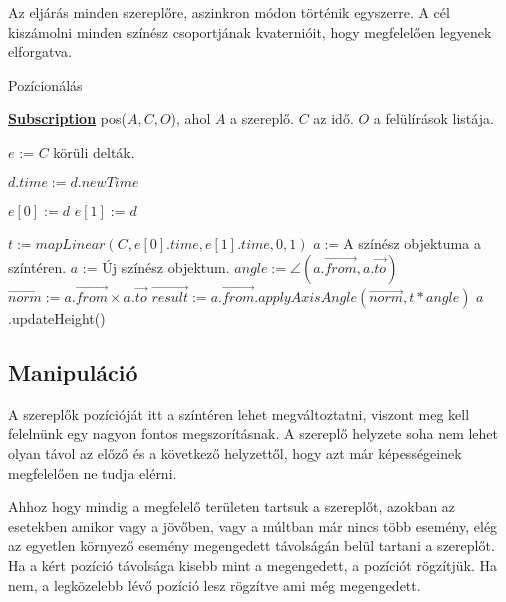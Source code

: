 Az eljárás minden szereplőre, aszinkron módon történik egyszerre. A cél kiszámolni minden színész csoportjának kvaternióit\cite{Quaternion}, hogy megfelelően legyenek elforgatva.

\begin{algorithm}[H]
	\caption{Pozícionálás}
	\label{alg:ibb}
	\textbf{\underline{Subscription}} pos($A, C, O$), ahol $A$ a szereplő. $C$ az idő. $O$ a felülírások listája.
	\begin{algorithmic}[1] %
	\STATE $e$ := $C$ körüli delták.

					\STATE $d.time := d.newTime$
				\ENDIF
			\ENDFOR

				\STATE $e[0] := d$
			\ENDIF
				\STATE $e[1] := d$
			\ENDIF

		\ENDFOR
	\ENDIF

	\STATE $t := mapLinear(C, e[0].time, e[1].time, 0, 1)$
	\STATE $a := $A színész objektuma a színtéren.  
		\STATE $a$ := Új színész objektum. 
	\ENDIF
	\STATE $angle := \angle(a.\overrightarrow{from}, a.\overrightarrow{to})$ 
	\STATE $\overrightarrow{norm} := a.\overrightarrow{from} × a.\overrightarrow{to}$ 
	\STATE $\overrightarrow{result} := a.\overrightarrow{from}.applyAxisAngle(\overrightarrow{norm}, t * angle) $
	\STATE $a$.updateHeight() 
	\end{algorithmic}
\end{algorithm}


\subsection{Manipuláció}

A szereplők pozícióját itt a színtéren lehet megváltoztatni, viszont meg kell felelnünk egy nagyon fontos megszorításnak. A szereplő helyzete soha nem lehet olyan távol az előző és a következő helyzettől, hogy azt már képességeinek megfelelően ne tudja elérni.

Ahhoz hogy mindig a megfelelő területen tartsuk a szereplőt, azokban az esetekben amikor vagy a jövőben, vagy a múltban már nincs több esemény, elég az egyetlen környező esemény megengedett távolságán belül tartani a szereplőt. Ha a kért pozíció távolsága kisebb mint a megengedett, a pozíciót rögzítjük. Ha nem, a legközelebb lévő pozíció lesz rögzítve ami még megengedett.

